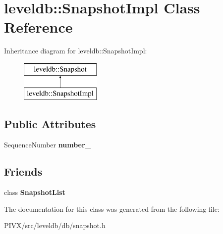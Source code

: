 \hypertarget{classleveldb_1_1_snapshot_impl}{}\section{leveldb\+:\+:Snapshot\+Impl Class Reference}
\label{classleveldb_1_1_snapshot_impl}
Inheritance diagram for leveldb\+:\+:Snapshot\+Impl\+:\begin{figure}[H]
\begin{center}
\leavevmode
\includegraphics[height=2.000000cm]{classleveldb_1_1_snapshot_impl}
\end{center}
\end{figure}
\subsection*{Public Attributes}
\begin{DoxyCompactItemize}
\item 
\mbox{\label{classleveldb_1_1_snapshot_impl_aa31dca969679d05d17c4c0eb1443a96e}} 
Sequence\+Number {\bfseries number\+\_\+}
\end{DoxyCompactItemize}
\subsection*{Friends}
\begin{DoxyCompactItemize}
\item 
\mbox{\label{classleveldb_1_1_snapshot_impl_abe14b2fb5e32159324c619e1a42327a0}} 
class {\bfseries Snapshot\+List}
\end{DoxyCompactItemize}


The documentation for this class was generated from the following file\+:\begin{DoxyCompactItemize}
\item 
P\+I\+V\+X/src/leveldb/db/snapshot.\+h\end{DoxyCompactItemize}
